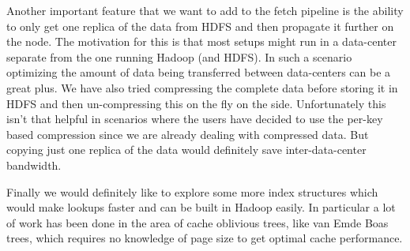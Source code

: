 \documentclass[10pt,twocolumn,preprint,nonatbib,numbers]{sigplanconf}
\begin{document}
Another important feature that we want to add to the fetch pipeline is the ability to only get one replica of the data from HDFS and then propagate it further on the \projectname{} node. The motivation for this is that most \projectname{} setups might run in a data-center separate from the one running Hadoop (and HDFS). In such a scenario optimizing the amount of data being transferred between data-centers can be a great plus. We have also tried compressing the complete data before storing it in HDFS and then un-compressing this on the fly on the \projectname{} side. Unfortunately this isn't that helpful in scenarios where the users have decided to use the per-key based compression since we are already dealing with compressed data. But copying just one replica of the data would definitely save inter-data-center bandwidth. 

Finally we would definitely like to explore some more index structures which would make lookups faster and can be built in Hadoop easily. In particular a lot of work has been done in the area of cache oblivious trees, like van Emde Boas trees, which requires no knowledge of page size to get optimal cache performance. 
\end{document}
